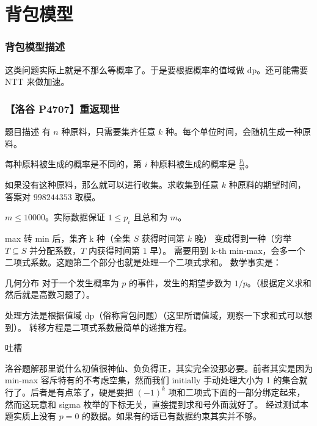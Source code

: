 \section{背包模型}

\begin{frame}
  \frametitle{背包模型描述}

  这类问题实际上就是不那么等概率了。于是要根据概率的值域做 dp。还可能需要 NTT 来做加速。

\end{frame}

\begin{frame}
  \frametitle{【洛谷 P4707】重返现世}

  \begin{block}{题目描述}
  有 $n$ 种原料，只需要集齐任意 $k$ 种。每个单位时间，会随机生成一种原料。

  每种原料被生成的概率是不同的，第 $i$ 种原料被生成的概率是 $\frac{p_i}{m}$。

  如果没有这种原料，那么就可以进行收集。求收集到任意 $k$ 种原料的期望时间，答案对 $998244353$ 取模。

  $m\le 10000$。实际数据保证 $1\le p_i$ 且总和为 $m$。

  \end{block}  

\end{frame}

\begin{frame}

  max 转 min 后，集\textbf{齐} k 种（全集 $S$ 获得时间第 $k$ 晚）
  变成得到\textbf{一}种（穷举 $T\subseteq S$ 并分配系数，$T$ 内获得时间第 $1$ 早）。
  需要用到 k-th min-max，会多一个二项式系数。这题第二个部分也就是处理一个二项式求和。
  数学事实是：

  \begin{exampleblock}{几何分布}
    对于一个发生概率为 $p$ 的事件，发生的期望步数为 $1/p$。（根据定义求和然后就是高数习题了）。
  \end{exampleblock}

  处理方法是根据值域 dp（俗称背包问题）（这里所谓值域，观察一下求和式可以想到）。
  转移方程是二项式系数最简单的递推方程。

\end{frame}

\begin{frame}

  \begin{alertblock}{吐槽}

    洛谷题解那里说什么初值很神仙、负负得正，其实完全没那必要。前者其实是因为 min-max 容斥特有的不考虑空集，然而我们 initially 手动处理大小为 1 的集合就行了。后者是有点笨了，硬是要把 $(-1)^{k}$ 项和二项式下面的一部分绑定起来，然而这玩意和 sigma 枚举的下标无关，直接提到求和号外面就好了。
    经过测试本题实质上没有 $p=0$ 的数据。如果有的话已有数据约束其实并不够。
    
  \end{alertblock}

\end{frame}

